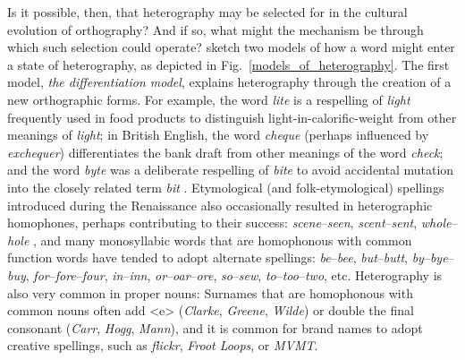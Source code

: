 \documentclass[doc,biblatex]{apa7}
\begin{document}
Is it possible, then, that heterography may be selected for in the cultural evolution of orthography? And if so, what might the mechanism be through which such selection could operate? \textcite[pp.~325--326]{Berg:2021} sketch two models of how a word might enter a state of heterography, as depicted in Fig.~\ref{models_of_heterography}. The first model, \textit{the differentiation model}, explains heterography through the creation of a new orthographic forms. For example, the word \textit{lite} is a respelling of \textit{light} frequently used in food products to distinguish light-in-calorific-weight from other meanings of \textit{light}; in British English, the word \textit{cheque} (perhaps influenced by \textit{exchequer}) differentiates the bank draft from other meanings of the word \textit{check}; and the word \textit{byte} was a deliberate respelling of \textit{bite} to avoid accidental mutation into the closely related term \textit{bit} \parencite{Buchholz:1977}. Etymological (and folk-etymological) spellings introduced during the Renaissance also occasionally resulted in heterographic homophones, perhaps contributing to their success: \textit{scene}--\textit{seen}, \textit{scent}--\textit{sent}, \textit{whole}--\textit{hole} \parencite[pp.~58--59]{Scragg:1974}, and many monosyllabic words that are homophonous with common function words have tended to adopt alternate spellings: \textit{be}--\textit{bee}, \textit{but}--\textit{butt}, \textit{by}--\textit{bye}--\textit{buy}, \textit{for}--\textit{fore}--\textit{four}, \textit{in}--\textit{inn}, \textit{or}--\textit{oar}--\textit{ore}, \textit{so}--\textit{sew}, \textit{to}--\textit{too}--\textit{two}, etc. Heterography is also very common in proper nouns: Surnames that are homophonous with common nouns often add <e> (\textit{Clarke}, \textit{Greene}, \textit{Wilde}) or double the final consonant (\textit{Carr}, \textit{Hogg}, \textit{Mann}), and it is common for brand names to adopt creative spellings, such as \textit{flickr}, \textit{Froot Loops}, or \textit{MVMT}.
\end{document}
